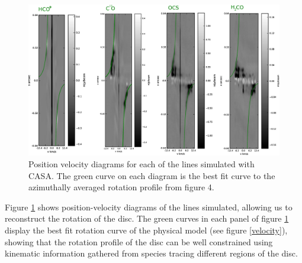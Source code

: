 \documentclass[useAMS,usenatbib]{mn2e}
\begin{document}
\begin{figure}
 \includegraphics[width=180mm]{Figures/sim/casa_all_30deg_PV_rotCurve_small.eps}
 \caption{Position velocity diagrams for each of the lines simulated with CASA. The green curve on each diagram is the best fit curve to the azimuthally averaged rotation profile from figure 4.}
 \label{pvs}
\end{figure}

Figure \ref{pvs} shows position-velocity diagrams of the lines simulated, allowing us to reconstruct the rotation of the disc. The green curves in each panel of figure \ref{pvs} display the best fit rotation curve of the physical model (see figure \ref{velocity}), showing that the rotation profile of the disc can be well constrained using kinematic information gathered from species tracing different regions of the disc.\smallskip
\end{document}
